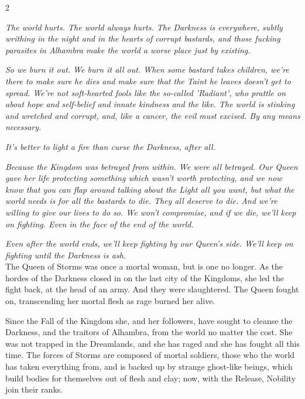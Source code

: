 \label{scha:Storms}\begin{multicols}{2}\raggedcolumns

\noindent\textit{The world hurts. The world always hurts. The Darkness is everywhere, subtly writhing in the night and in the hearts of corrupt bastards, and those fucking parasites in Alhambra make the world a worse place just by existing. }

\textit{So we burn it out. We burn it all out. When some bastard takes children, we're there to make sure he dies and make sure that the Taint he leaves doesn't get to spread. We're not soft-hearted fools like the so-called 'Radiant', who prattle on about hope and self-belief and innate kindness and the like. The world is stinking and wretched and corrupt, and, like a cancer, the evil must excised. By any means necessary. }

\textit{It's better to light a fire than curse the Darkness, after all.}

\textit{Because the Kingdom was betrayed from within. We were all betrayed. Our Queen gave her life protecting something which wasn't worth protecting, and we now know that you can flap around talking about the Light all you want, but what the world needs is for all the bastards to die. They all deserve to die. And we're willing to give our lives to do so. We won't compromise, and if we die, we'll keep on fighting. Even in the face of the end of the world.}

\textit{Even after the world ends, we'll keep fighting by our Queen's side. We'll keep on fighting until the Darkness is ash.}\\

\noindent The Queen of Storms was once a mortal woman, but is one no longer. As the hordes of the Darkness closed in on the last city of the Kingdoms, she led the fight back, at the head of an army. And they were slaughtered. The Queen fought on, transcending her mortal flesh as rage burned her alive. 

Since the Fall of the Kingdom she, and her followers, have sought to cleanse the Darkness, and the traitors of Alhambra, from the world no matter the cost. She was not trapped in the Dreamlands, and she has raged and she has fought all this time. The forces of Storms are composed of mortal soldiers, those who the world has taken everything from, and is backed up by strange ghost-like beings, which build bodies for themselves out of flesh and clay; now, with the Release, Nobility join their ranks. 


\end{multicols}
